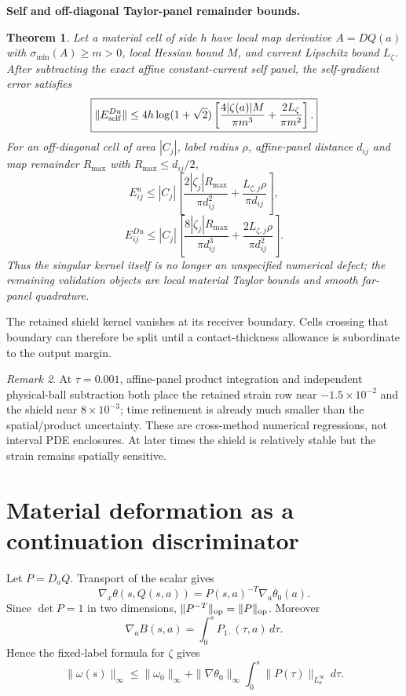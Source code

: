 \documentclass[11pt]{article}
\newtheorem{theorem}{Theorem}[section]\newtheorem{proposition}[theorem]{Proposition}
\theoremstyle{definition}\newtheorem{definition}[theorem]{Definition}\newtheorem{problem}[theorem]{Problem}
\theoremstyle{remark}\newtheorem{remark}[theorem]{Remark}
\begin{document}
\medskip
\noindent\textbf{Self and off-diagonal Taylor-panel remainder bounds.}
\begin{theorem}
Let a material cell of side $h$ have local map derivative $A=DQ(a)$ with
$\sigma_{\min}(A)\ge m>0$, local Hessian bound $M$, and current Lipschitz bound
$L_\zeta$. After subtracting the exact affine constant-current self panel, the
self-gradient error satisfies
\[
\boxed{
 \|E^{Du}_{\rm self}\|
 \le4h\log(1+\sqrt2)
 \left[
 \frac{4|\zeta(a)|M}{\pi m^3}
 +\frac{2L_\zeta}{\pi m^2}
 \right].
}
\]
For an off-diagonal cell of area $|C_j|$, label radius $\rho$, affine-panel
distance $d_{ij}$ and map remainder $R_{\max}$ with
$R_{\max}\le d_{ij}/2$,
\[
 E^u_{ij}\le |C_j|
 \left[
 \frac{2|\zeta_j|R_{\max}}{\pi d_{ij}^2}
 +\frac{L_{\zeta,j}\rho}{\pi d_{ij}}
 \right],
\]
\[
 E^{Du}_{ij}\le |C_j|
 \left[
 \frac{8|\zeta_j|R_{\max}}{\pi d_{ij}^3}
 +\frac{2L_{\zeta,j}\rho}{\pi d_{ij}^2}
 \right].
\]
Thus the singular kernel itself is no longer an unspecified numerical defect;
the remaining validation objects are local material Taylor bounds and smooth
far-panel quadrature.
\end{theorem}

The retained shield kernel vanishes at its receiver boundary. Cells crossing
that boundary can therefore be split until a contact-thickness allowance is
subordinate to the output margin.

\begin{remark}
At $\tau=0.001$, affine-panel product integration and independent physical-ball
subtraction both place the retained strain row near $-1.5\times10^{-2}$ and the
shield near $8\times10^{-3}$; time refinement is already much smaller than the
spatial/product uncertainty. These are cross-method numerical regressions,
not interval PDE enclosures. At later times the shield is relatively stable
but the strain remains spatially sensitive.
\end{remark}

\section{Material deformation as a continuation discriminator}
\label{sec:deformation-continuation}
Let $P=D_aQ$. Transport of the scalar gives
\[
 \nabla_x\theta(s,Q(s,a))=P(s,a)^{-T}\nabla_a\theta_0(a).
\]
Since $\det P=1$ in two dimensions,
$\|P^{-T}\|_{\rm op}=\|P\|_{\rm op}$. Moreover
\[
 \nabla_aB(s,a)=\int_0^sP_{1\cdot}(\tau,a)\,d\tau.
\]
Hence the fixed-label formula for $\zeta$ gives
\[
 \|\omega(s)\|_\infty
 \le\|\omega_0\|_\infty
 +\|\nabla\theta_0\|_\infty
 \int_0^s\|P(\tau)\|_{L^\infty_a}\,d\tau.
\]
\end{document}
